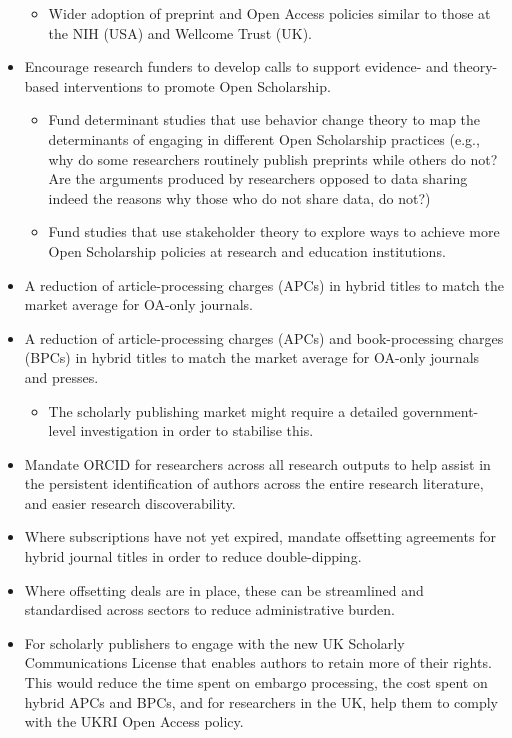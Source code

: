 \documentclass[]{article}
\providecommand{\tightlist}{%
  \setlength{\itemsep}{0pt}\setlength{\parskip}{0pt}}
\begin{document}
\begin{itemize}
  \begin{itemize}
  \tightlist
  \item
    Wider adoption of preprint and Open Access policies similar to those
    at the NIH (USA) and Wellcome Trust (UK).
  \end{itemize}
\item
  Encourage research funders to develop calls to support evidence- and
  theory-based interventions to promote Open Scholarship.

  \begin{itemize}
  \item
    Fund determinant studies that use behavior change theory to map the
    determinants of engaging in different Open Scholarship practices
    (e.g., why do some researchers routinely publish preprints while
    others do not? Are the arguments produced by researchers opposed to
    data sharing indeed the reasons why those who do not share data, do
    not?)
  \item
    Fund studies that use stakeholder theory to explore ways to achieve
    more Open Scholarship policies at research and education
    institutions.
  \end{itemize}
\item
  A reduction of article-processing charges (APCs) in hybrid titles to
  match the market average for OA-only journals.
\item
  A reduction of article-processing charges (APCs) and book-processing
  charges (BPCs) in hybrid titles to match the market average for
  OA-only journals and presses.

  \begin{itemize}
  \tightlist
  \item
    The scholarly publishing market might require a detailed
    government-level investigation in order to stabilise this.
  \end{itemize}
\item
  Mandate ORCID for researchers across all research outputs to help
  assist in the persistent identification of authors across the entire
  research literature, and easier research discoverability.
\item
  Where subscriptions have not yet expired, mandate offsetting
  agreements for hybrid journal titles in order to reduce
  double-dipping.
\item
  Where offsetting deals are in place, these can be streamlined and
  standardised across sectors to reduce administrative burden.
\item
  For scholarly publishers to engage with the new UK Scholarly
  Communications License that enables authors to retain more of their
  rights. This would reduce the time spent on embargo processing, the
  cost spent on hybrid APCs and BPCs, and for researchers in the UK,
  help them to comply with the UKRI Open Access policy.


\end{itemize}
\end{document}
